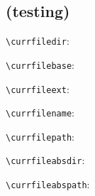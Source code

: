 \documentclass[a4paper]{article}
\makeatletter
\newenvironment{jzrplain}{%
  \lineskiplimit=-10pt%
  \lineskip=0pt%
  \topskip=0pt%
  \setlength{\parskip}{4mm}%
  \setlength{\parindent}{0mm}%
  \leading{4mm}
  }%
  {\par}
\makeatother
\begin{document}
\begin{jzrplain}

\CXLTX





\subsection{(testing)}

\verb#\currfiledir#:  \currfiledir

\verb#\currfilebase#: \currfilebase

\verb#\currfileext#:  \currfileext

\verb#\currfilename#: \currfilename

\verb#\currfilepath#: \currfilepath

\verb#\currfileabsdir#:   \currfileabsdir

\verb#\currfileabspath#:  \currfileabspath


\end{jzrplain}
\end{document}
